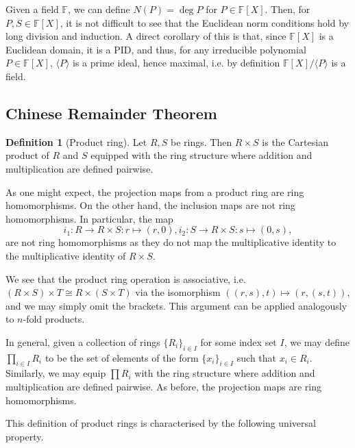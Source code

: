 \documentclass[]{article}
\theoremstyle{definition}
\theoremstyle{definition}
\newtheorem{definition}{Definition}[section]
\begin{document}
Given a field \(\mathbb{F}\), we can define \(N(P) = \deg P\) for 
\(P \in \mathbb{F}[X]\). Then, for \(P, S \in \mathbb{F}[X]\), it is not 
difficult to see that the Euclidean norm conditions hold by long division and 
induction. A direct corollary of this is that, since \(\mathbb{F}[X]\) is 
a Euclidean domain, it is a PID, and thus, for any irreducible polynomial 
\(P \in \mathbb{F}[X]\), \(\langle P \rangle\) is a prime ideal, hence maximal, 
i.e. by definition \(\mathbb{F}[X] / \langle P \rangle\) is a field.

\subsection{Chinese Remainder Theorem}

\begin{definition}[Product ring]
  Let \(R, S\) be rings. Then \(R \times S\) is the Cartesian product of 
  \(R\) and \(S\) equipped with the ring structure where addition and 
  multiplication are defined pairwise.
\end{definition}

As one might expect, the projection maps from a product ring are ring 
homomorphisms. On the other hand, the inclusion maps are not ring homomorphisms.
In particular, the map
\[i_1 : R \to R \times S : r \mapsto (r, 0), i_2 : S \to R \times S : s \mapsto (0, s),\]
are not ring homomorphisms as they do not map the multiplicative identity 
to the multiplicative identity of \(R \times S\).

We see that the product ring operation is associative, i.e. 
\((R \times S) \times T \cong R \times (S \times T)\) via the isomorphism 
\(((r, s), t) \mapsto (r, (s, t))\), and we may simply omit the brackets. 
This argument can be applied analogously to \(n\)-fold products. 

In general, given a collection of rings \(\{R_i\}_{i \in I}\) for some index set 
\(I\), we may define \(\prod_{i \in I} R_i\)
to be the set of elements of the form \(\{x_i\}_{i \in I}\) such that 
\(x_i \in R_i\). Similarly, we may equip \(\prod R_i\) with the ring structure 
where addition and multiplication are defined pairwise. As before, the projection 
maps are ring homomorphisms.

This definition of product rings is characterised by the following universal property. 
\end{document}
